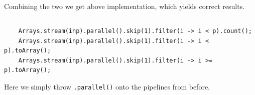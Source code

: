 \documentclass[a5paper]{article}
\begin{document}
Combining the two we get above implementation, which yields correct results.

\subsection{}
\begin{lstlisting}
    Arrays.stream(inp).parallel().skip(1).filter(i -> i < p).count();
    Arrays.stream(inp).parallel().skip(1).filter(i -> i < p).toArray();
    Arrays.stream(inp).parallel().skip(1).filter(i -> i >= p).toArray();
\end{lstlisting}
Here we simply throw \texttt{.parallel()} onto the pipelines from before.

\subsection{}
\end{document}
